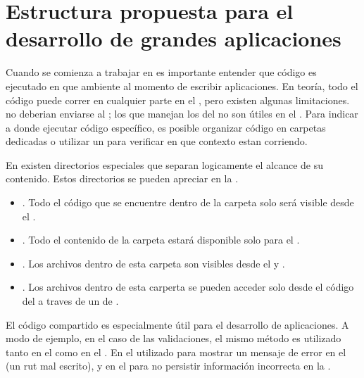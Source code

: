 \section{Estructura propuesta para el desarrollo de grandes aplicaciones}\label{cap:arquitectura:section:generic_architecture_structure}

Cuando se comienza a trabajar en \meteorNAME es importante entender que código es ejecutado en que ambiente al momento de escribir aplicaciones. En teoría, todo el código puede correr en cualquier parte en el \stackAS, pero existen algunas limitaciones. \apikeyAS no deberian enviarse al \clientAS; los \events que manejan los \clicks del \mouse no son útiles en el \serverAS. Para indicar a \meteorNAME donde ejecutar código específico, es posible organizar código en carpetas dedicadas o utilizar un \checkCPT para verificar en que contexto estan corriendo.

En \meteorNAME existen directorios especiales que separan logicamente el alcance de su contenido. Estos directorios se pueden apreciar en la .


	\begin{itemize}
		\item
			\textbf{\clientFolder}. Todo el código que se encuentre dentro de la carpeta  \clientFolder solo será visible desde el \clientSideAS.
		\item
			\textbf{\serverFolder}.  Todo el contenido de la carpeta \serverFolder estará disponible solo para el \serverSideAS.
		\item
			\textbf{\publicFolder}. Los archivos dentro de esta carpeta son visibles desde el \clientSideAS y \serverSideAS.
		\item
			\textbf{\privateFolder}. Los archivos dentro de esta carperta se pueden acceder solo desde el código del \serverAS a traves de un \apiAS de \assetsAS.
	\end{itemize}



El código compartido es especialmente útil para el desarrollo de aplicaciones. A modo de ejemplo, en el caso de las validaciones, el mismo método es utilizado tanto en el \clientSideAS como en el \serverSideAS. En el \clientSideAS utilizado para mostrar un mensaje de error en el \browserINT (un rut mal escrito), y en el \serverSideAS para no persistir información incorrecta en la \dataBaseDB.

